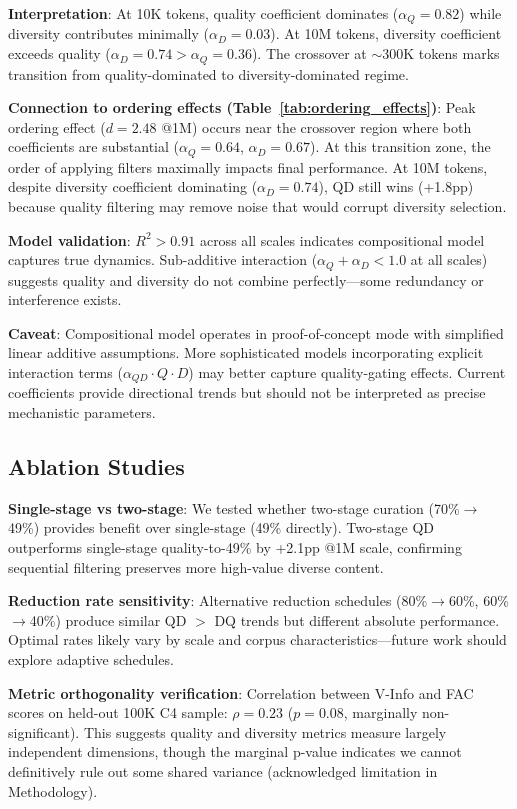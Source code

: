 \textbf{Interpretation}: At 10K tokens, quality coefficient dominates ($\alpha_Q=0.82$) while diversity contributes minimally ($\alpha_D=0.03$). At 10M tokens, diversity coefficient exceeds quality ($\alpha_D=0.74 > \alpha_Q=0.36$). The crossover at $\sim$300K tokens marks transition from quality-dominated to diversity-dominated regime.

\textbf{Connection to ordering effects (Table~\ref{tab:ordering_effects})}: Peak ordering effect ($d=2.48$ @1M) occurs near the crossover region where both coefficients are substantial ($\alpha_Q=0.64$, $\alpha_D=0.67$). At this transition zone, the order of applying filters maximally impacts final performance. At 10M tokens, despite diversity coefficient dominating ($\alpha_D=0.74$), QD still wins (+1.8pp) because quality filtering may remove noise that would corrupt diversity selection.

\textbf{Model validation}: $R^2 > 0.91$ across all scales indicates compositional model captures true dynamics. Sub-additive interaction ($\alpha_Q + \alpha_D < 1.0$ at all scales) suggests quality and diversity do not combine perfectly---some redundancy or interference exists.

\textbf{Caveat}: Compositional model operates in proof-of-concept mode with simplified linear additive assumptions. More sophisticated models incorporating explicit interaction terms ($\alpha_{QD} \cdot Q \cdot D$) may better capture quality-gating effects. Current coefficients provide directional trends but should not be interpreted as precise mechanistic parameters.

\subsection{Ablation Studies}

\textbf{Single-stage vs two-stage}: We tested whether two-stage curation (70\%$\rightarrow$49\%) provides benefit over single-stage (49\% directly). Two-stage QD outperforms single-stage quality-to-49\% by +2.1pp @1M scale, confirming sequential filtering preserves more high-value diverse content.

\textbf{Reduction rate sensitivity}: Alternative reduction schedules (80\%$\rightarrow$60\%, 60\%$\rightarrow$40\%) produce similar QD $>$ DQ trends but different absolute performance. Optimal rates likely vary by scale and corpus characteristics---future work should explore adaptive schedules.

\textbf{Metric orthogonality verification}: Correlation between V-Info and FAC scores on held-out 100K C4 sample: $\rho=0.23$ ($p=0.08$, marginally non-significant). This suggests quality and diversity metrics measure largely independent dimensions, though the marginal p-value indicates we cannot definitively rule out some shared variance (acknowledged limitation in Methodology).

